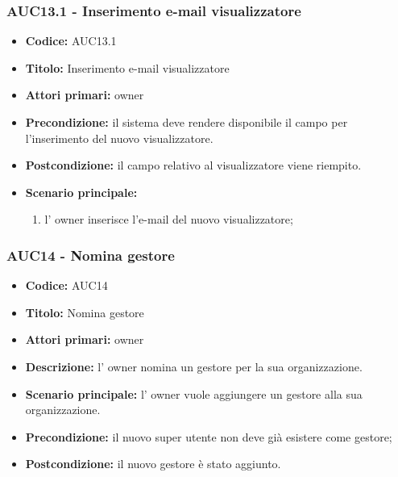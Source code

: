 \documentclass[casi-duso]{subfiles}
\begin{document}
\subsubsection{AUC13.1 - Inserimento e-mail visualizzatore}%
\label{subsub:AUC13.1}
\begin{itemize}
  \item \textbf{Codice:} AUC13.1
  \item \textbf{Titolo:} Inserimento e-mail visualizzatore
  \item \textbf{Attori primari:} owner
  \item \textbf{Precondizione:} il sistema deve rendere disponibile il campo per l'inserimento del nuovo visualizzatore.
  \item \textbf{Postcondizione:} il campo relativo al visualizzatore viene riempito.
  \item \textbf{Scenario principale:} 
  \begin{enumerate}
    \item l' owner inserisce l'e-mail del nuovo visualizzatore;
  \end{enumerate}
\end{itemize}

\subsubsection{AUC14 - Nomina gestore}%
\label{subsub:AUC14}
\begin{itemize}
  \item \textbf{Codice:} AUC14
  \item \textbf{Titolo:} Nomina gestore
  \item \textbf{Attori primari:} owner
  \item \textbf{Descrizione:} l' owner nomina un gestore per la sua organizzazione.
  \item \textbf{Scenario principale:} l' owner vuole aggiungere un gestore alla sua organizzazione.
  \item \textbf{Precondizione:} il nuovo super utente non deve già esistere come gestore;
  \item \textbf{Postcondizione:} il nuovo gestore è stato aggiunto.
\end{itemize}
\end{document}
